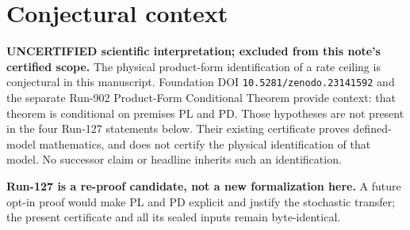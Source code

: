 \documentclass[11pt]{article}
\begin{document}
\section*{Conjectural context}
\noindent\textbf{UNCERTIFIED scientific interpretation; excluded from this note's certified scope.} The physical product-form identification of a rate ceiling is conjectural in this manuscript. Foundation DOI \texttt{10.5281/zenodo.23141592} and the separate Run-902 Product-Form Conditional Theorem provide context: that theorem is conditional on premises PL and PD. Those hypotheses are not present in the four Run-127 statements below. Their existing certificate proves defined-model mathematics, and does not certify the physical identification of that model. No successor claim or headline inherits such an identification.

\noindent\textbf{Run-127 is a re-proof candidate, not a new formalization here.} A future opt-in proof would make PL and PD explicit and justify the stochastic transfer; the present certificate and all its sealed inputs remain byte-identical.
\end{document}
